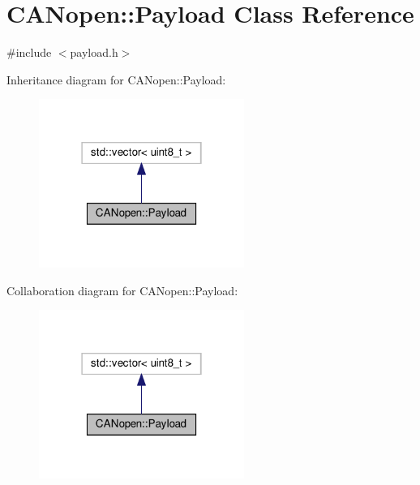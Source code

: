 \hypertarget{class_c_a_nopen_1_1_payload}{}\section{C\+A\+Nopen\+:\+:Payload Class Reference}
\label{class_c_a_nopen_1_1_payload}


{\ttfamily \#include $<$payload.\+h$>$}



Inheritance diagram for C\+A\+Nopen\+:\+:Payload\+:\nopagebreak
\begin{figure}[H]
\begin{center}
\leavevmode
\includegraphics[width=190pt]{class_c_a_nopen_1_1_payload__inherit__graph}
\end{center}
\end{figure}


Collaboration diagram for C\+A\+Nopen\+:\+:Payload\+:\nopagebreak
\begin{figure}[H]
\begin{center}
\leavevmode
\includegraphics[width=190pt]{class_c_a_nopen_1_1_payload__coll__graph}
\end{center}
\end{figure}
